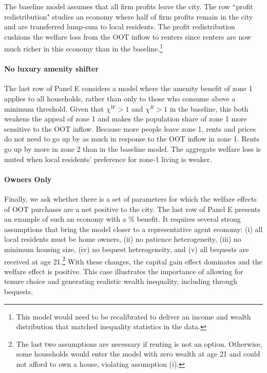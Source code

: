 \documentclass[letterpaper,12pt,dvipsnames,usenames]{article}
\theoremstyle{definition}
\begin{document}
\begin{spacing}{1.25}
{The baseline model assumes that all firm profits leave the city. The row ``profit redistribution" studies an economy where half of firm profits remain in the city and are transferred lump-sum to local residents. The profit redistribution cushions the welfare loss from the OOT inflow to renters since renters are now much richer in this economy than in the baseline.\footnote{This model would need to be recalibrated to deliver an income and wealth distribution that matched inequality statistics in the data.}

\paragraph{No luxury amenity shifter}

The last row of Panel E considers a model where the amenity benefit of zone 1 applies to all households, rather than only to those who consume above a minimum threshold. Given that $\chi^W>1$ and $\chi^R>1$ in the baseline, this both weakens the appeal of zone 1 and makes the population share of zone 1 more sensitive to the OOT inflow. Because more people leave zone 1, rents and prices do not need to go up by as much in response to the OOT inflow in zone 1. Rents go up by more in zone 2 than in the baseline model. The aggregate welfare loss is muted when local residents' preference for zone-1 living is weaker.

\paragraph{Owners Only}

Finally, we ask whether there is a set of parameters for which the welfare effects of OOT purchases are a net positive to the city. The last row of Panel E presents an example of such an economy with a \% benefit. It requires several strong assumptions that bring the model closer to a representative agent economy: (i) all local residents must be home owners, (ii) no patience heterogeneity, (iii) no minimum housing size,  (iv)  no bequest heterogeneity, and (v) all bequests are received at age 21.\footnote{The last two assumptions are necessary if renting is not an option. Otherwise, some households would enter the model with zero wealth at age 21 and could not afford to own a house, violating assumption (i).} With these changes, the capital gain effect dominates and the welfare effect is positive. This case illustrates the importance of allowing for tenure choice and generating realistic wealth inequality, including through bequests.


}
\end{spacing}
\end{document}
